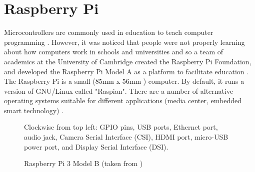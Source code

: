 \documentclass[a4]{report}
\begin{document}




	\section{Raspberry Pi}
	\noindent
	Microcontrollers are commonly used in education to teach computer programming \cite{backmcedu1, backmcedu2}. However, it was noticed that people were not properly learning about how computers work in schools and universities and so a team of academics at the University of Cambridge created the Raspberry Pi Foundation, and developed the Raspberry Pi Model A as a platform to facilitate education \cite{pihistory}. The Raspberry Pi is a small (85mm x 56mm \cite{pi3mechdraw}) computer. By default, it runs a version of GNU/Linux called "Raspian". There are a number of alternative operating systems suitable for different applications (media center, embedded smart technology) \cite{piotheros}.  \newline
	\begin{figure}[!htb]
	\centering
	\caption{Raspberry Pi 3 Model B (taken from  \cite{pi3info})}
	\label{pidia}
	\footnotesize Clockwise from top left: GPIO pins, USB ports, Ethernet port, audio jack, Camera Serial Interface (CSI), HDMI port, micro-USB power port, and Display Serial Interface (DSI).
	\end{figure} \newline%
\end{document}
